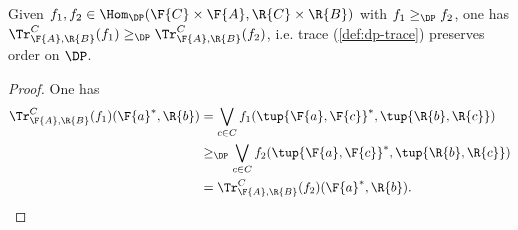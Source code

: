 \begin{lemma}
Given $f_1,f_2\in \Hom_\DP(\F{C}\times \F{A},\R{C}\times \R{B})$ with $f_1\geq_\DP f_2$, one has $\Tr_{\F{A},\R{B}}^C(f_1)\geq_\DP \Tr_{\F{A},\R{B}}^C(f_2)$, i.e. trace (\cref{def:dp-trace}) preserves order on $\DP$.
\end{lemma}

\begin{proof}
One has
\begin{equation}
    \begin{aligned}
    \Tr_{\F{A},\R{B}}^C(f_1)(\F{a}^*,\R{b})&=\bigvee_{c\in C}f_1(\tup{\F{a},\F{c}}^*,\tup{\R{b},\R{c}})\\
    &\geq_\DP \bigvee_{c\in C}f_2(\tup{\F{a},\F{c}}^*,\tup{\R{b},\R{c}})\\
    &=\Tr_{\F{A},\R{B}}^C(f_2)(\F{a}^*,\R{b}).
    \end{aligned}
\end{equation}
\end{proof}